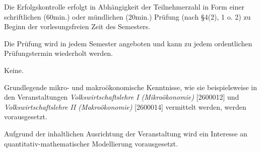 \begin{course}

\setdoclanguagegerman
{}



\coursehead


\label{cour_8375.dp_997}


\begin{styleenv}
\begin{assessment}
Die Erfolgskontrolle erfolgt in Abhängigkeit der Teilnehmerzahl in Form einer schriftlichen (60min.) oder mündlichen (20min.) Prüfung (nach §4(2), 1 o. 2) zu Beginn der vorlesungsfreien Zeit des Semesters.

 

Die Prüfung wird in jedem Semester angeboten und kann zu jedem ordentlichen Prüfungstermin wiederholt werden.


\end{assessment}

\begin{conditions}Keine.\end{conditions}

\begin{recommendations}Grundlegende mikro- und makroökonomische Kenntnisse, wie sie beispielsweise in den Veranstaltungen \emph{Volkswirtschaftslehre I (Mikroökonomie)} [2600012] und \emph{Volkswirtschaftslehre II (Makroökonomie)} [2600014] vermittelt werden, werden vorausgesetzt.

 

Aufgrund der inhaltlichen Ausrichtung der Veranstaltung wird ein Interesse an quantitativ-mathematischer Modellierung vorausgesetzt.

\end{recommendations}
\end{styleenv}


\end{course}
